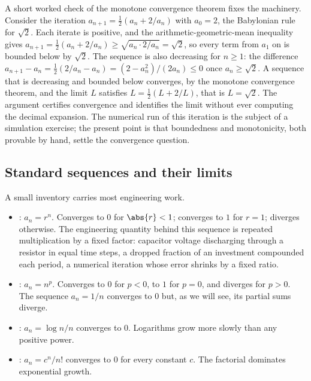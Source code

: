 A short worked check of the monotone convergence theorem fixes the
machinery. Consider the iteration $a_{n+1} = \tfrac{1}{2}(a_{n} +
2/a_{n})$ with $a_{0} = 2$, the Babylonian rule for $\sqrt{2}$. Each
iterate is positive, and the arithmetic-geometric-mean inequality gives
$a_{n+1} = \tfrac{1}{2}(a_{n} + 2/a_{n}) \geq \sqrt{a_{n} \cdot 2/a_{n}}
= \sqrt{2}$, so every term from $a_{1}$ on is bounded below by
$\sqrt{2}$. The sequence is also decreasing for $n \geq 1$: the
difference $a_{n+1} - a_{n} = \tfrac{1}{2}(2/a_{n} - a_{n}) =
(2 - a_{n}^{2})/(2 a_{n}) \leq 0$ once $a_{n} \geq \sqrt{2}$. A
sequence that is decreasing and bounded below converges, by the
monotone convergence theorem, and the limit $L$ satisfies $L =
\tfrac{1}{2}(L + 2/L)$, that is $L = \sqrt{2}$. The argument certifies
convergence and identifies the limit without ever computing the decimal
expansion. The numerical run of this iteration is the subject of a
simulation exercise; the present point is that boundedness and
monotonicity, both provable by hand, settle the convergence question.

\subsection{Standard sequences and their limits}

A small inventory carries most engineering work.

\begin{itemize}[leftmargin=*]
  \item {}: $a_{n} = r^{n}$. Converges to $0$ for
    $\abs{r} < 1$; converges to $1$ for $r = 1$; diverges otherwise.
    The engineering quantity behind this sequence is repeated
    multiplication by a fixed factor: capacitor voltage discharging
    through a resistor in equal time steps, a dropped fraction of an
    investment compounded each period, a numerical iteration whose
    error shrinks by a fixed ratio.
  \item {}: $a_{n} = n^{p}$. Converges to $0$ for
    $p < 0$, to $1$ for $p = 0$, and diverges for $p > 0$. The
     sequence $a_{n} = 1/n$ converges to $0$ but, as
    we will see, its partial sums diverge.
  \item {}: $a_{n} = \log n / n$ converges to $0$.
    Logarithms grow more slowly than any positive power.
  \item {}: $a_{n} = c^{n} / n!$ converges to $0$ for
    every constant $c$. The factorial dominates exponential growth.
\end{itemize}

